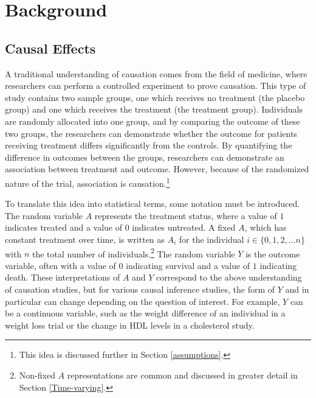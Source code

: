 
\chapter{Background}


\section{Causal Effects} 

A traditional understanding of causation comes from the field of medicine, where researchers can perform a controlled experiment to prove causation.  This type of study contains two sample groups, one which receives no treatment (the placebo group) and one which receives the treatment (the treatment group).  Individuals are randomly allocated into one group, and by comparing the outcome of these two groups, the researchers can demonstrate whether the outcome for patients receiving treatment differs significantly from the controls.  By quantifying the difference in outcomes between the groups, researchers can demonstrate an association between treatment and outcome.  However, because of the randomized nature of the trial, association is causation.\footnote{This idea is discussed further in Section \ref{assumptions}.}\cite{hernan2006estimating}  

To translate this idea into statistical terms, some notation must be introduced.  The random variable $A$ represents the treatment status, where a value of $1$ indicates treated and a value of $0$ indicates untreated.  A fixed $A$, which has constant treatment over time, is written as $A_i$ for the individual $i \in \{0,1,2,\dots n\}$ with $n$ the total number of individuals.\footnote{Non-fixed $A$ representations are common and discussed in greater detail in Section \ref{Time-varying}.} The random variable $Y$ is the outcome variable, often with a value of $0$ indicating survival and a value of $1$ indicating death.  These interpretations of $A$ and $Y$ correspond to the above understanding of causation studies, but for various causal inference studies, the form of $Y$ and  in particular can change depending on the question of interest.  For example, $Y$ can be a continuous variable, such as the weight difference of an individual in a weight loss trial or the change in HDL levels in a cholesterol study. 

